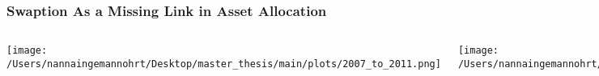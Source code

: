 \documentclass{beamer}
\begin{document}
\begin{frame}
    \frametitle{\textcolor{KUrod}{Swaption As a Missing Link in Asset Allocation}}
    \begin{columns}
        \begin{center}
            \texttt{[image: /Users/nannaingemannohrt/Desktop/master\_thesis/main/plots/2007\_to\_2011.png]}
        \end{center}

        \begin{center}
            \texttt{[image: /Users/nannaingemannohrt/Desktop/master\_thesis/main/plots/2022\_to\_2024.png]}
        \end{center}
    \end{columns}

\end{frame}
\end{document}
